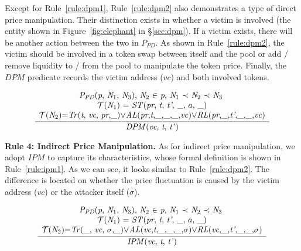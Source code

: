 Except for Rule~\ref{rule:dpm1}, Rule~\ref{rule:dpm2} also demonstrates a type of direct price manipulation. Their distinction exists in whether a victim is involved (the entity shown in Figure~\ref{fig:elephant} in \S\ref{sec:dpm}).
If a victim exists, there will be another action between the two in $P_{PD}$. As shown in Rule~\ref{rule:dpm2}, the victim should be involved in a token swap between itself and the pool or add / remove liquidity to / from the pool to manipulate the token price.
Finally, the $DPM$ predicate records the victim address ($vc$) and both involved tokens.
\begin{small}
\begin{equation}
\label{rule:dpm2}
\frac{
    \begin{array}{c}
    \text{$\textit{P}_{\textit{PD}}$(\textit{p}, $\textit{N}_{1}$, $\textit{N}_{3}$), $\textit{N}_{2}$ $\in$ \textit{p}, $\textit{N}_{1}$ $\prec$ $\textit{N}_{2}$ $\prec$ $\textit{N}_{3}$ } \\
    \text{$\mathcal{T}$($\textit{N}_{1}$) = \textit{ST}(\textit{pr}, \textit{t}, \textit{t'}, \_, $a$, \_)} \\
    \text{$\mathcal{T}$($\textit{N}_{2}$)=\textit{Tr}(\textit{t}, \textit{vc}, \textit{pr},\_)$\vee$\textit{AL}(\textit{pr},\textit{t},\_,\_,\_,\textit{vc})$\vee$\textit{RL}(\textit{pr},\_,\textit{t'},\_,\_,\textit{vc})}
    \end{array}
}{
    \text{\textit{DPM}(\textit{vc}, \textit{t}, \textit{t'})}
}
\end{equation}
\end{small}

\noindent
\textbf{Rule 4: Indirect Price Manipulation.}
As for indirect price manipulation, we adopt $IPM$ to capture its characteristics, whose formal definition is shown in Rule~\ref{rule:ipm1}.
As we can see, it looks similar to Rule~\ref{rule:dpm2}. The difference is located on whether the price fluctuation is caused by the victim address ($vc$) or the attacker itself ($\sigma$). 
\begin{small}
\begin{equation}
\label{rule:ipm1}
\frac{
    \begin{array}{c}
    \text{$\textit{P}_{\textit{PD}}$(\textit{p}, $\textit{N}_{1}$, $\textit{N}_{3}$), $\textit{N}_{2}$ $\in$ \textit{p}, $\textit{N}_{1}$ $\prec$ $\textit{N}_{2}$ $\prec$ $\textit{N}_{3}$ } \\
    \text{$\mathcal{T}$($\textit{N}_{1}$) = \textit{ST}(\textit{pr}, \textit{t}, \textit{t'}, \_, $a$, \_)} \\
    \text{$\mathcal{T}$($\textit{N}_{2}$)=\textit{Tr}(\_, \textit{vc}, $\sigma$,\_)$\vee$\textit{AL}(\textit{vc},\textit{t},\_,\_,\_,$\sigma$)$\vee$\textit{RL}(\textit{vc},\_,\textit{t'},\_,\_,$\sigma$)}
    \end{array}
}{
    \text{\textit{IPM}(\textit{vc}, \textit{t}, \textit{t'})}
}
\end{equation}
\end{small}


